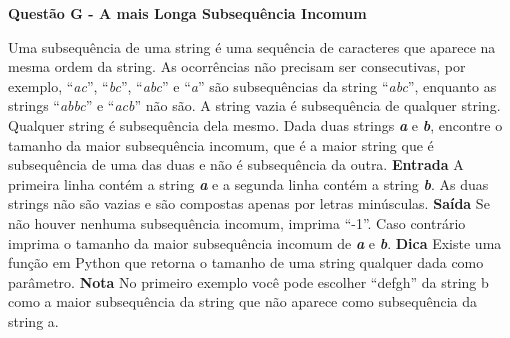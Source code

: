 \documentclass[a4paper, 12pt]{article}
\begin{document}
\newpage %
\begin{center}
\textbf{{\Large Questão G - A mais Longa Subsequência Incomum}}
\end{center}
\vspace{5pt}
Uma subsequência de uma string é uma sequência de caracteres que aparece na mesma ordem da string. As ocorrências não precisam ser consecutivas, por exemplo, ``\textit{ac}'', ``\textit{bc}'', ``\textit{abc}'' e ``\textit{a}'' são subsequências da string ``\textit{abc}'', enquanto as strings ``\textit{abbc}'' e
``\textit{acb}'' não são. A string vazia é subsequência de qualquer string. Qualquer string é subsequência dela mesmo. \newline \newline
Dada duas strings \textbf{\textit{a}} e \textbf{\textit{b}}, encontre o tamanho da maior subsequência incomum, que é a maior string que é subsequência de uma das duas e não é subsequência da outra.
\newline \newline
\textbf{{\large Entrada}} \newline
A primeira linha contém a string \textbf{\textit{a}} e a segunda linha contém a string \textbf{\textit{b}}. As duas strings não são vazias e são compostas apenas por letras minúsculas.
\newline \newline
\textbf{{\large Saída}} \newline
Se não houver nenhuma subsequência incomum, imprima ``-1''. Caso contrário imprima o tamanho da maior subsequência incomum de \textbf{\textit{a}} e \textbf{\textit{b}}.
\newline \newline
\textbf{{\large Dica}} \newline
Existe uma função em Python que retorna o tamanho de uma string qualquer dada como parâmetro.
\newline \newline
\textbf{{\large Nota}} \newline
No primeiro exemplo você pode escolher ``defgh'' da string b como a maior subsequência da string que não aparece como subsequência da string a.
\newline
\end{document}
